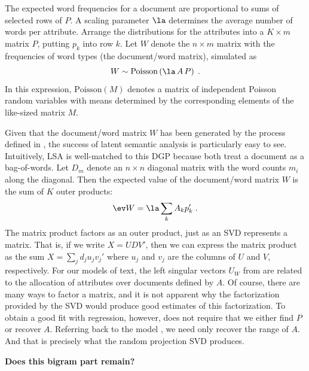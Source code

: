 \documentclass[12pt]{article}
\begin{document}
The expected word frequencies for a document are proportional to sums of selected rows of $P$.  A scaling parameter  $\la$ determines the average number of words per attribute.   Arrange the distributions for the attributes into a $K \times m$ matrix $P$, putting $p_k$ into row $k$.   Let $W$ denote the $n \times m$ matrix with the frequencies of word types (the document/word matrix), simulated as
\begin{equation}
	W \sim \mbox{Poisson} \left(\la \, A \, P \right) \;.
  \label{eq:simW}
\end{equation}
In this expression, $\mbox{Poisson}(M)$ denotes a matrix of independent Poisson random variables with means determined by the corresponding elements of the like-sized matrix $M$.

 
 Given that the document/word matrix $W$ has been  generated by the process defined in , the success of latent semantic analysis is particularly easy to see. Intuitively, LSA is well-matched to this DGP because both treat a document as a bag-of-words.  Let $D_m$ denote an $n \times n$ diagonal matrix with the  word counts $m_i$ along the diagonal.  Then the expected value of the document/word matrix $W$ is the sum of $K$ outer products:
\begin{equation}
    \ev W = \la \sum_k A_k p_k' \;.
  \label{eq:EW}
\end{equation}
The matrix product factors as an outer product, just as an SVD represents a matrix. That is, if we write $X = UDV'$, then we can express the matrix product as the sum $X = \sum_j d_{j} u_j v_j'$ where $u_j$ and $v_j$ are the columns of $U$ and $V$, respectively.  For our models of text, the left singular vectors $U_W$ from  are related to the allocation of attributes over documents defined by $A$.  Of course, there are many ways to factor a matrix, and it is not apparent why the factorization provided by the SVD would produce good estimates of this factorization.  To obtain a good fit with regression, however, does not require that we either find $P$ or recover $A$.  Referring back to the model , we need only recover the range of $A$.  And that is precisely what the random projection SVD produces.

\vspace{0.5in}

{\bf Does this bigram part remain? }
\end{document}
